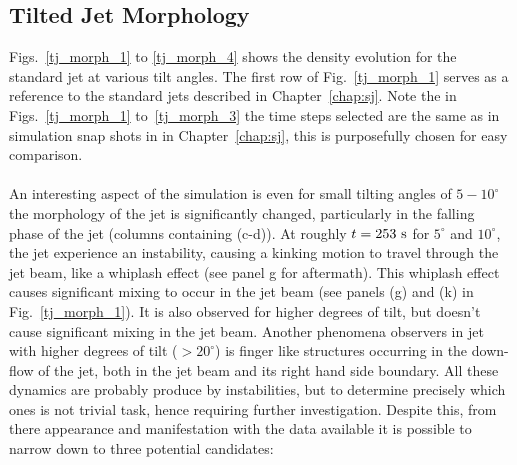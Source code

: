 \documentclass[12pt]{ociamthesis}
\newcommand{\np}{\\ \\}
\begin{document}
\subsection{Tilted Jet Morphology}
\label{subsec:steady}
Figs.~\ref{tj_morph_1} to \ref{tj_morph_4} shows the density evolution for the standard jet at various tilt angles. The first row of Fig.~\ref{tj_morph_1} serves as a reference to the standard jets described in Chapter~\ref{chap:sj}. Note the in Figs.~\ref{tj_morph_1} to~\ref{tj_morph_3} the time steps selected are the same as in simulation snap shots in in Chapter~\ref{chap:sj}, this is purposefully chosen for easy comparison. \np
%
An interesting aspect of the simulation is even for small tilting angles of $5-10^{\circ}$ the morphology of the jet is significantly changed, particularly in the falling phase of the jet (columns containing (c-d)). At roughly $t=253~\rm{s}$ for $5^{\circ}$ and $10^{\circ}$, the jet experience an instability, causing a kinking motion to travel through the jet beam, like a whiplash effect (see panel g for aftermath). This whiplash effect causes significant mixing to occur in the jet beam (see panels (g) and (k) in Fig.~\ref{tj_morph_1}). It is also observed for higher degrees of tilt, but doesn't cause significant mixing in the jet beam. Another phenomena observers in jet with higher degrees of tilt ($>20^{\circ}$) is finger like structures occurring in the down-flow of the jet, both in the jet beam and its right hand side boundary. All these dynamics are probably produce by instabilities, but to determine precisely which ones is not trivial task, hence requiring further investigation. Despite this, from there appearance and manifestation with the data available it is possible to narrow down to three potential candidates:
\end{document}

